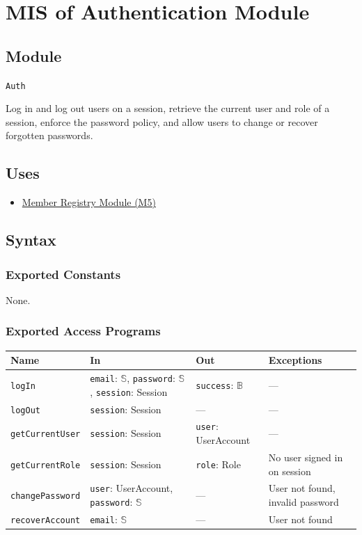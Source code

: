\documentclass[12pt, titlepage]{article}
\begin{document}
\newpage

\section{MIS of Authentication Module} \label{mAuthn}

\subsection{Module}
\texttt{Auth}

Log in and log out users on a session, retrieve the current user and role of a session, enforce the password policy, and allow users to change or recover forgotten passwords.

\subsection{Uses}
\begin{itemize}
  \item \hyperref[mMembers]{Member Registry Module (M5)}
\end{itemize}

\subsection{Syntax}

\subsubsection{Exported Constants}
None.

\subsubsection{Exported Access Programs}
\begin{tabularx}{\textwidth}{p{3.4cm} p{4.6cm} p{3.1cm} X}
\toprule
\textbf{Name} & \textbf{In} & \textbf{Out} & \textbf{Exceptions} \\
\midrule
\texttt{logIn} & \texttt{email}: $\mathbb{S}$, \texttt{password}: $\mathbb{S}$, \texttt{session}: Session & \texttt{success}: $\mathbb{B}$ & --- \\
\texttt{logOut} & \texttt{session}: Session & --- & --- \\
\texttt{getCurrentUser} & \texttt{session}: Session & \texttt{user}: UserAccount & --- \\
\texttt{getCurrentRole} & \texttt{session}: Session & \texttt{role}: Role & No user signed in on session \\
\texttt{changePassword} & \texttt{user}: UserAccount, \texttt{password}: $\mathbb{S}$ & --- & User not found, invalid password \\
\texttt{recoverAccount} & \texttt{email}: $\mathbb{S}$ & --- & User not found \\
\bottomrule
\end{tabularx}
\end{document}
